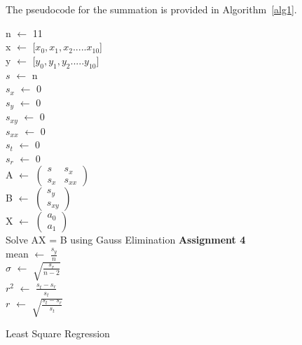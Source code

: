 \documentclass[titlepage, 11pt]{article}
\begin{document}
The pseudocode for the summation is provided in Algorithm~\ref{alg1}.
\begin{center}
\begin{algorithm}[H]\label{alg1}

\SetAlgoLined
{
n $\gets$ 11 \\
x $\gets$ [$x_0,x_1,x_2.....x_{10}$] \\
y $\gets$ [$y_0,y_1,y_2.....y_{10}$] \\
$s$ $\gets$ n \\
$s_x$ $\gets$ 0 \\ 
$s_y$ $\gets$ 0 \\ 
$s_{xy}$ $\gets$ 0 \\ 
$s_{xx}$ $\gets$ 0 \\ 
$s_t$ $\gets$ 0 \\
$s_r$ $\gets$ 0 \\
A $\gets$
$\begin{pmatrix}
s & s_x\\
s_x & s_{xx}
\end{pmatrix}$ \\
B $\gets$
$\begin{pmatrix}
s_y \\
s_{xy}
\end{pmatrix}$ \\
X $\gets$
$\begin{pmatrix}
a_0 \\
a_1
\end{pmatrix}$ \\
Solve AX = B using Gauss Elimination \textbf{Assignment 4}\\
mean $\gets$ $\frac{s_y}{n}$ \\
$\sigma$ $\gets$ $\sqrt{\frac{s_r}{n-2}}$\\
$r^2$ $\gets$ $\frac{s_t-s_r}{s_t}$\\
$r$ $\gets$ $\sqrt{\frac{s_t-s_r}{s_t}}$\\
}
 \caption{Least Square Regression}
\end{algorithm}    
\end{center}
\end{document}

